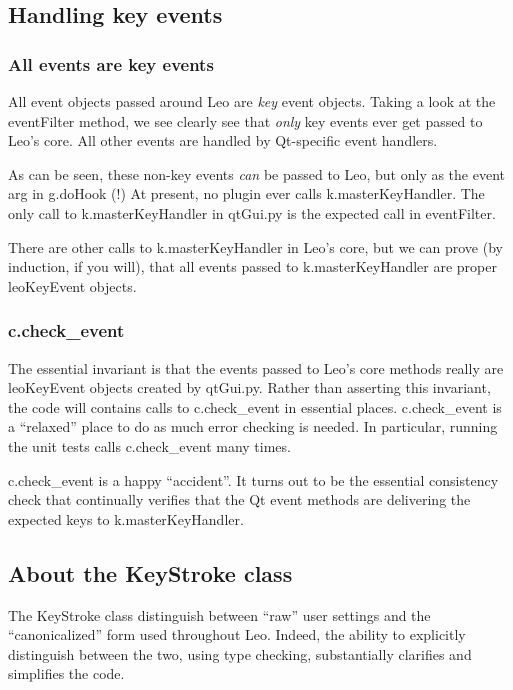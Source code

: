 \documentclass[a4paper,10pt,english]{sphinxmanual}
\begin{document}
\subsection{Handling key events}
\label{theory:handling-key-events}

\subsubsection{All events are key events}
\label{theory:all-events-are-key-events}
All event objects passed around Leo are \emph{key} event objects. Taking a look at
the eventFilter method, we see clearly see that \emph{only} key events ever get
passed to Leo's core. All other events are handled by Qt-specific event
handlers.

As can be seen, these non-key events \emph{can} be passed to Leo, but only as the
event arg in g.doHook (!) At present, no plugin ever calls k.masterKeyHandler.
The only call to k.masterKeyHandler in qtGui.py is the expected call in
eventFilter.

There are other calls to k.masterKeyHandler in Leo's core, but we can prove (by
induction, if you will), that all events passed to k.masterKeyHandler are proper
leoKeyEvent objects.


\subsubsection{c.check\_event}
\label{theory:c-check-event}
The essential invariant is that the events passed to Leo's core methods really
are leoKeyEvent objects created by qtGui.py.  Rather than asserting this
invariant, the code will contains calls to c.check\_event in essential places.
c.check\_event is a ``relaxed'' place to do as much error checking is needed.  In
particular, running the unit tests calls c.check\_event many times.

c.check\_event is a happy ``accident''.  It turns out to be the essential
consistency check that continually verifies that the Qt event methods are
delivering the expected keys to k.masterKeyHandler.


\subsection{About the KeyStroke class}
\label{theory:about-the-keystroke-class}
The KeyStroke class distinguish between ``raw'' user settings
and the ``canonicalized'' form used throughout Leo. Indeed,
the ability to explicitly distinguish between the two, using
type checking, substantially clarifies and simplifies the
code.
\end{document}
